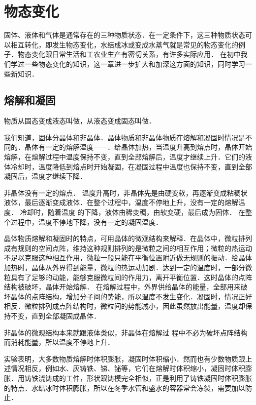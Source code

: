 \chapter{物态变化}\label{chapter-change-of-state-of-matter}

固体、液体和气体是通常存在的三种物质状态．在一定条件下，这三种物质状态可以相互转化，即发生物态变化，水结成冰或变成水蒸气就是常见的物态变化的例子．物态变化跟日常生活和工农业生产有密切关系，有许多实际应用．
在初中我们学过一些物态变化的知识，这一章进一步扩大和加深这方面的知识，同时学习一些新知识．

\section{熔解和凝固}
物质从固态变成液态叫做，从液态变成固态叫做．

我们知道，固体分晶体和非晶体．晶体物质和非晶体物质在熔解和凝固时情况是不同的．晶体有一定的熔解温度——．给晶体加热，当温度升高到熔点时，晶体开始熔解，在熔解过程中温度保持不变，直到全部熔解后，温度才继续上升．它们的液体冷却时，温度降低到熔点时开始凝固，在凝固过程中温度也保持不变，直到全部凝固后，温度才继续下降．

非晶体没有一定的熔点．
温度升高时，非晶体先是由硬变软，再逐渐变成粘稠状液体，最后逐渐变成液体．在整个过程中，温度不停地上升，没有一定的熔解温度．
冷却时，随着温度
的下降，液体由稀变稠，由软变硬，最后成为固体．
在整个过程中，温度不停地下降，没有一定的凝固温度．

晶体物质熔解和凝固时的特点，可用晶体的微观结构来解释．在晶体中，微粒排列成有规则的空间点阵，维持这种规则排列的是微粒之间的相互作用；微粒的热运动不足以克服这种相互作用，微粒一般只能在平衡位置附近做无规则的振动．给晶体加热时，晶体从外界得到能量，微粒的热运动加剧．达到一定的温度时，一部分微粒具有了足够的动能，能够克服微粒间的作用力，离开平衡位置．这时晶体的点阵结构被破坏，晶体开始熔解．
在熔解过程中，外界供给晶体的能量，全部用来破坏晶体的点阵结构，增加分子间的势能，所以温度不发生变化．凝固时，情况正好相反．微粒排列成点阵结构时，微粒间的势能减小，因此虽然放出能量，温度却保持不变，直到全部凝固成晶体．

非晶体的微观结构本来就跟液体类似，非晶体在熔解过
程中不必为破坏点阵结构而消耗能量，所以温度不停地上升．

实验表明，大多数物质熔解时体积膨胀，凝固时体积缩小．然而也有少数物质跟上述情况相反，例如水、灰铸铁、锑、铋等，它们在熔解时体积缩小，凝固时体积膨胀．用铸铁浇铸成的工件，形状跟铸模完全相似，正是利用了铸铁凝固时体积膨胀的特点．水结冰时体积膨胀，所以在冬季水管和盛水的容器常会冻裂，需要加以防止．

